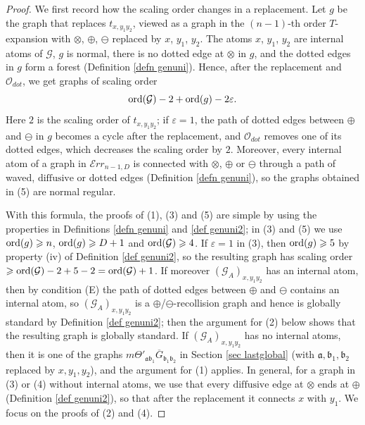 \documentclass{article}
\newcommand{\1}{\mathds{1}}
\numberwithin{equation}{section}
\newcommand{\ord}{{\rm{ord}}}
\newcommand{\fa}{{\mathfrak a}}
\newcommand{\fb}{{\mathfrak b}}
\renewcommand{\cal}{\mathcal}
\renewcommand{\epsilon}{\varepsilon}
\renewcommand{\geq}{\geqslant}
\renewcommand{\ge}{\geq}
\newcommand{\dashed}{\text{diffusive}}
\theoremstyle{plain} %
\theoremstyle{remark}
\newcommand{\Err}{{\mathcal Err}}
\begin{document}
\begin{proof}
We first record how the scaling order changes in a replacement. Let $g$ be the graph that replaces $t_{x,y_1y_2}$, viewed as a graph in the $(n-1)$-th order $T$-expansion with $\otimes$, $\oplus$, $\ominus$ replaced by $x$, $y_1$, $y_2$. The atoms $x$, $y_1$, $y_2$ are internal atoms of $\cal G$, $g$ is normal, there is no dotted edge at $\otimes$ in $g$, and the dotted edges in $g$ form a forest (Definition \ref{defn genuni}). Hence, after the replacement and $\cal O_{dot}$, we get graphs of scaling order
$$\ord(\cal G)-2+\ord(g)-2\epsilon .$$
Here $2$ is the scaling order of $t_{x,y_1y_2}$; if $\epsilon=1$, the path of dotted edges between $\oplus$ and $\ominus$ in $g$ becomes a cycle after the replacement, and $\cal O_{dot}$ removes one of its dotted edges, which decreases the scaling order by $2$. Moreover, every internal atom of a graph in $\Err_{n-1,D}$ is connected with $\otimes$, $\oplus$ or $\ominus$ through a path of waved, $\dashed$ or dotted edges (Definition \ref{defn genuni}), so the graphs obtained in (5) are normal regular.

With this formula, the proofs of (1), (3) and (5) are simple by using the properties in Definitions \ref{defn genuni} and \ref{def genuni2}; in (3) and (5) we use $\ord(g)\ge n$, $\ord(g)\ge D+1$ and $\ord(\cal G)\ge 4$. If $\epsilon=1$ in (3), then $\ord(g)\ge 5$ by property (iv) of Definition \ref{def genuni2}, so the resulting graph has scaling order $\ge \ord(\cal G)-2+5-2=\ord(\cal G)+1$. If moreover $(\cal G_{A})_{x,y_1y_2}$ has an internal atom, then by condition (E) the path of dotted edges between $\oplus$ and $\ominus$ contains an internal atom, so $(\cal G_{A})_{x,y_1y_2}$ is a $\oplus$/$\ominus$-recollision graph and hence is globally standard by Definition \ref{def genuni2}; then the argument for (2) below shows that the resulting graph is globally standard. If $(\cal G_{A})_{x,y_1y_2}$ has no internal atoms, then it is one of the graphs $m\Theta'_{\fa\fb_1}\overline G_{\fb_1\fb_2}$ in Section \ref{sec lastglobal} (with $\fa,\fb_1,\fb_2$ replaced by $x,y_1,y_2$), and the argument for (1) applies. In general, for a graph in (3) or (4) without internal atoms, we use that every $\dashed$ edge at $\otimes$ ends at $\oplus$ (Definition \ref{def genuni2}), so that after the replacement it connects $x$ with $y_1$. We focus on the proofs of (2) and (4).


\end{proof}
\end{document}
